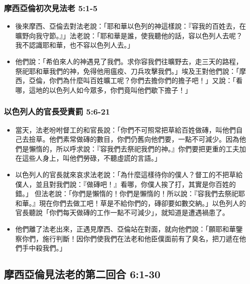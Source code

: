\subsubsection{摩西亞倫初次見法老 5:1-5}
\begin{itemize} 
\itemsep-.35em 
\item 後來摩西、亞倫去對法老說：「耶和華以色列的神這樣說：『容我的百姓去，在曠野向我守節。』」法老說：「耶和華是誰，使我聽他的話，容以色列人去呢？我不認識耶和華，也不容以色列人去。」
\item 他們說：「希伯來人的神遇見了我們。求你容我們往曠野去，走三天的路程，祭祀耶和華我們的神，免得他用瘟疫、刀兵攻擊我們。」埃及王對他們說：「摩西，亞倫，你們為什麼叫百姓曠工呢？你們去擔你們的擔子吧！」又說：「看哪，這地的以色列人如今眾多，你們竟叫他們歇下擔子！」
\end{itemize}

\subsubsection{以色列人的官長受責罰 5:6-21}
\begin{itemize} 
\itemsep-.35em 
\item 當天，法老吩咐督工的和官長說：「你們不可照常把草給百姓做磚，叫他們自己去撿草。他們素常做磚的數目，你們仍舊向他們要，一點不可減少。因為他們是懶惰的，所以呼求說：『容我們去祭祀我們的神。』你們要把更重的工夫加在這些人身上，叫他們勞碌，不聽虛謊的言語。」
\item 以色列人的官長就來哀求法老說：「為什麼這樣待你的僕人？督工的不把草給僕人，並且對我們說：『做磚吧！』看哪，你僕人挨了打，其實是你百姓的錯。」 但法老說：「你們是懶惰的！你們是懶惰的！所以說：『容我們去祭祀耶和華。』現在你們去做工吧！草是不給你們的，磚卻要如數交納。」以色列人的官長聽說「你們每天做磚的工作一點不可減少」，就知道是遭遇禍患了。
\item 他們離了法老出來，正遇見摩西、亞倫站在對面，就向他們說：「願耶和華鑒察你們，施行判斷！因你們使我們在法老和他臣僕面前有了臭名，把刀遞在他們手中殺我們。」
\end{itemize}

\subsection{摩西亞倫見法老的第二回合 6:1-30}
